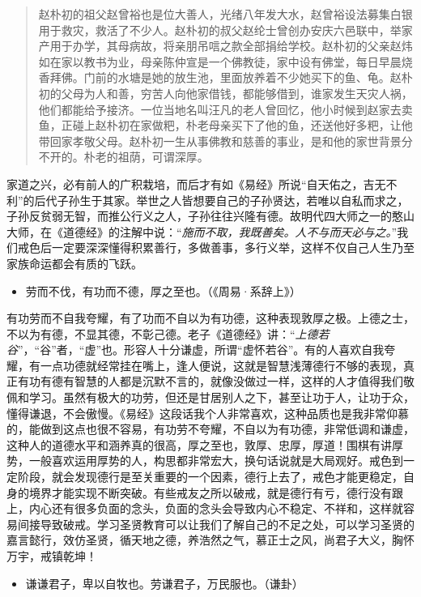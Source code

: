 \begin{quotation}
    赵朴初的祖父赵曾裕也是位大善人，光绪八年发大水，赵曾裕设法募集白银用于救灾，救活了不少人。赵朴初的叔父赵纶士曾创办安庆六邑联中，举家产用于办学，其母病故，将亲朋吊唁之款全部捐给学校。赵朴初的父亲赵炜如在家以教书为业，母亲陈仲宣是一个佛教徒，家中设有佛堂，每日早晨烧香拜佛。门前的水塘是她的放生池，里面放养着不少她买下的鱼、龟。赵朴初的父母为人和善，穷苦人向他家借钱，都能够借到，谁家发生天灾人祸，他们都能给予接济。一位当地名叫汪凡的老人曾回忆，他小时候到赵家去卖鱼，正碰上赵朴初在家做粑，朴老母亲买下了他的鱼，还送他好多粑，让他带回家孝敬父母。赵朴初一生从事佛教和慈善的事业，是和他的家世背景分不开的。朴老的祖荫，可谓深厚。
\end{quotation}

家道之兴，必有前人的广积栽培，而后才有如《易经》所说“自天佑之，吉无不利”的后代子孙生于其家。举世之人皆想要自己的子孙贤达，若唯以自私而求之，子孙反贫弱无智，而推公行义之人，子孙往往兴隆有德。故明代四大师之一的憨山大师，在《道德经》的注解中说：“\textit{施而不取，我既善矣。人不与而天必与之。}”我们戒色后一定要深深懂得积累善行，多做善事，多行义举，这样不仅自己人生乃至家族命运都会有质的飞跃。

\begin{itemize}\it
    \item 劳而不伐，有功而不德，厚之至也。（《周易·系辞上》）
\end{itemize}

有功劳而不自我夸耀，有了功而不自以为有功德，这种表现敦厚之极。上德之士，不以为有德，不显其德，不彰己德。老子《道德经》讲：“\textit{上德若谷}”，“谷”者，“虚”也。形容人十分谦虚，所谓“虚怀若谷”。有的人喜欢自我夸耀，有一点功德就经常挂在嘴上，逢人便说，这就是智慧浅薄德行不够的表现，真正有功有德有智慧的人都是沉默不言的，就像没做过一样，这样的人才值得我们敬佩和学习。虽然有极大的功劳，但还是甘居别人之下，甚至让功于人，让功于众，懂得谦退，不会傲慢。《易经》这段话我个人非常喜欢，这种品质也是我非常仰慕的，能做到这点也很不容易，有功劳不夸耀，不自以为有功德，非常低调和谦虚，这种人的道德水平和涵养真的很高，厚之至也，敦厚、忠厚，厚道！围棋有讲厚势，一般喜欢运用厚势的人，构思都非常宏大，换句话说就是大局观好。戒色到一定阶段，就会发现德行是至关重要的一个因素，德行上去了，戒色才能更稳定，自身的境界才能实现不断突破。有些戒友之所以破戒，就是德行有亏，德行没有跟上，内心还有很多负面的念头，负面的念头会导致内心不稳定、不祥和，这样就容易间接导致破戒。学习圣贤教育可以让我们了解自己的不足之处，可以学习圣贤的嘉言懿行，效仿圣贤，循天地之德，养浩然之气，慕正士之风，尚君子大义，胸怀万宇，戒镇乾坤！

\begin{itemize}\it
    \item 谦谦君子，卑以自牧也。劳谦君子，万民服也。（谦卦）
\end{itemize}

